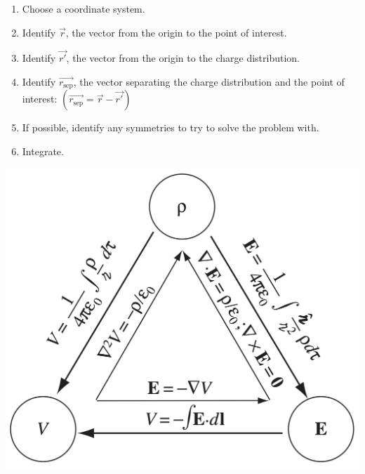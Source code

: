\documentclass{article}
\newcommand{\sepvec}{\vec{r_\textrm{sep}}}
\newcommand{\formbox}[2]{\begin{center} \begin{tcolorbox}[title = #1, boxrule=2pt,arc=3.4pt,boxsep=0mm] #2\end{tcolorbox}\end{center}}
\begin{document}
\begin{multicols*}{3}
\formbox{Problem Solving Stragegy -- Coulomb Integrals}{
    \begin{enumerate}
        \item Choose a coordinate system.
        \item Identify $\vec{r}$, the vector from the origin to the point of interest.
        \item Identify $\vec{r'}$, the vector from the origin to the charge distribution.
        \item Identify $\sepvec$, the vector separating the charge distribution and the point of interest:
        $(\sepvec = \vec{r} - \vec{r'})$
        \item If possible, identify any symmetries to try to solve the problem with.
        \item Integrate.
    \end{enumerate}
}

\formbox{The Electricity and Magnetism Triangle}{
    \begin{center}
        \includegraphics[scale=0.145]{em-triangle}
    \end{center}
}

\end{multicols*}
\end{document}

